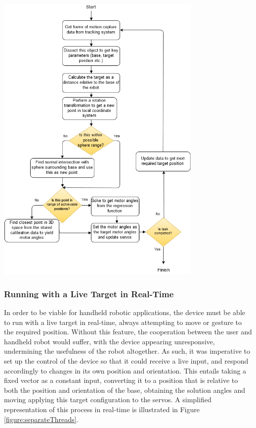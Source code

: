 \documentclass[11pt]{article}
\begin{document}
\begin{center}
\includegraphics[width=0.75\textwidth]{images/algorithmFlowDiagram.png}
\label{figure:getSolution}
\end{center}




\subsubsection{Running with a Live Target in Real-Time}
\label{section:liveTargetRealTime}

In order to be viable for handheld robotic applications, the device must be able to run with a live target in real-time, always attempting to move or gesture to the required position. Without this feature, the cooperation between the user and handheld robot would suffer, with the device appearing unresponsive, undermining the usefulness of the robot altogether. As such, it was imperative to set up the control of the device so that it could receive a live input, and respond accordingly to changes in its own position and orientation. This entails taking a fixed vector as a constant input, converting it to a position that is relative to both the position and orientation of the base, obtaining the solution angles and moving applying this target configuration to the servos. A simplified representation of this process in real-time is illustrated in Figure \ref{figure:separateThreads}.
\end{document}
